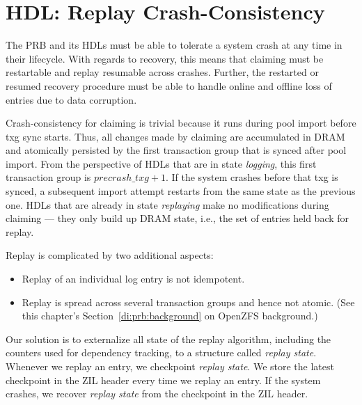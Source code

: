 \documentclass[12pt,a4paper,twoside]{book}
\begin{document}
\section{HDL: Replay Crash-Consistency}\label{di:prb:ccrecovery}

The PRB and its HDLs must be able to tolerate a system crash at any time in their lifecycle.
With regards to recovery, this means that claiming must be restartable and replay resumable across crashes.
Further, the restarted or resumed recovery procedure must be able to handle online and offline loss of entries due to data corruption.

Crash-consistency for claiming is trivial because it runs during pool import before txg sync starts.
Thus, all changes made by claiming are accumulated in DRAM and atomically persisted by the first transaction group that is synced after pool import.
From the perspective of HDLs that are in state \textit{logging}, this first transaction group is $precrash\_txg + 1$.
If the system crashes before that txg is synced, a subsequent import attempt restarts from the same state as the previous one.
HDLs that are already in state \textit{replaying} make no modifications during claiming --- they only build up DRAM state, i.e., the set of entries held back for replay.

Replay is complicated by two additional aspects:
\begin{itemize}[noitemsep]
    \item Replay of an individual log entry is not idempotent.
    \item Replay is spread across several transaction groups and hence not atomic.
        (See this chapter's Section~\ref{di:prb:background} on OpenZFS background.)
\end{itemize}
Our solution is to externalize all state of the replay algorithm, including the counters used for dependency tracking, to a structure called \textit{replay state}.
Whenever we replay an entry, we checkpoint \textit{replay state}.
We store the latest checkpoint in the ZIL header every time we replay an entry.
If the system crashes, we recover \textit{replay state} from the checkpoint in the ZIL header.
\end{document}

